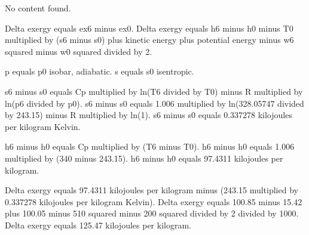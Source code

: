No content found.

Delta exergy equals ex6 minus ex0.  
Delta exergy equals h6 minus h0 minus T0 multiplied by (s6 minus s0) plus kinetic energy plus potential energy minus w6 squared minus w0 squared divided by 2.  

p equals p0 isobar, adiabatic.  
s equals s0 isentropic.  

s6 minus s0 equals Cp multiplied by ln(T6 divided by T0) minus R multiplied by ln(p6 divided by p0).  
s6 minus s0 equals 1.006 multiplied by ln(328.05747 divided by 243.15) minus R multiplied by ln(1).  
s6 minus s0 equals 0.337278 kilojoules per kilogram Kelvin.  

h6 minus h0 equals Cp multiplied by (T6 minus T0).  
h6 minus h0 equals 1.006 multiplied by (340 minus 243.15).  
h6 minus h0 equals 97.4311 kilojoules per kilogram.  

Delta exergy equals 97.4311 kilojoules per kilogram minus (243.15 multiplied by 0.337278 kilojoules per kilogram Kelvin).  
Delta exergy equals 100.85 minus 15.42 plus 100.05 minus 510 squared minus 200 squared divided by 2 divided by 1000.  
Delta exergy equals 125.47 kilojoules per kilogram.
